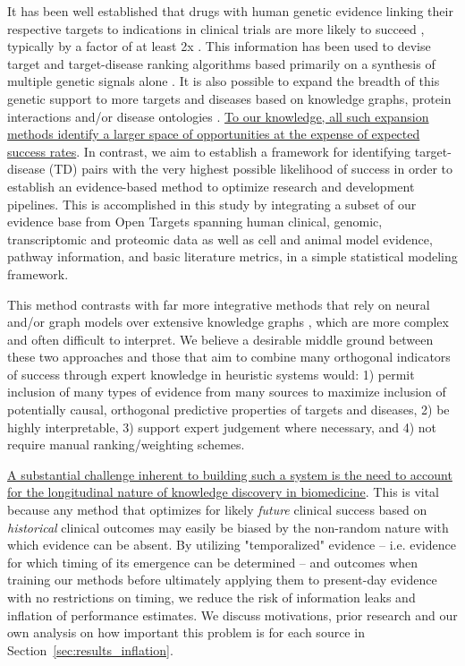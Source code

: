 \documentclass{article}
\begin{document}
It has been well established that drugs with human genetic evidence linking their respective targets to indications in clinical trials are more likely to succeed \cite{PMID:24833294,PMID:35804044,Razuvayevskaya2023.02.07.23285407,PMID:37803084,PMID:36963162}, typically by a factor of at least 2x \cite{Minikel2023.06.23.23291765,Nelson2015-eg,King2019-rc,PMID:30652614,Sadler2023-xd}. This information has been used to devise target and target-disease ranking algorithms based primarily on a synthesis of multiple genetic signals alone \cite{PMID:38172303,Koscielny2017-rr,PMID:31253980}. It is also possible to expand the breadth of this genetic support to more targets and diseases based on knowledge graphs, protein interactions and/or disease ontologies \cite{PMID:33262371,Bao2022-bq,Sadler2023-xd,PMID:36087372,PMID:36823319}. \ul{To our knowledge, all such expansion methods identify a larger space of opportunities at the expense of expected success rates}. In contrast, we aim to establish a framework for identifying target-disease (TD) pairs with the very highest possible likelihood of success in order to establish an evidence-based method to optimize research and development pipelines. This is accomplished in this study by integrating a subset of our evidence base from Open Targets \cite{Koscielny2017-rr} spanning human clinical, genomic, transcriptomic and proteomic data as well as cell and animal model evidence, pathway information, and basic literature metrics, in a simple statistical modeling framework. 

This method contrasts with far more integrative methods that rely on neural and/or graph models over extensive knowledge graphs \cite{Paliwal2020-hr,PMID:33741907,pittala2020relationweighted,PMID:32750869}, which are more complex and often difficult to interpret. We believe a desirable middle ground between these two approaches and those that aim to combine many orthogonal indicators of success through expert knowledge in heuristic systems \cite{PMID:38404138,Koscielny2017-rr} would: 1) permit inclusion of many types of evidence from many sources to maximize inclusion of potentially causal, orthogonal predictive properties of targets and diseases, 2) be highly interpretable, 3) support expert judgement where necessary, and 4) not require manual ranking/weighting schemes. 

\ul{A substantial challenge inherent to building such a system is the need to account for the longitudinal nature of knowledge discovery in biomedicine}. This is vital because any method that optimizes for likely \textit{future} clinical success based on \textit{historical} clinical outcomes may easily be biased by the non-random nature with which evidence can be absent. By utilizing "temporalized" evidence -- i.e. evidence for which timing of its emergence can be determined -- and outcomes when training our methods before ultimately applying them to present-day evidence with no restrictions on timing, we reduce the risk of information leaks and inflation of performance estimates. We discuss motivations, prior research and our own analysis on how important this problem is for each source in Section~\ref{sec:results_inflation}.
\end{document}
